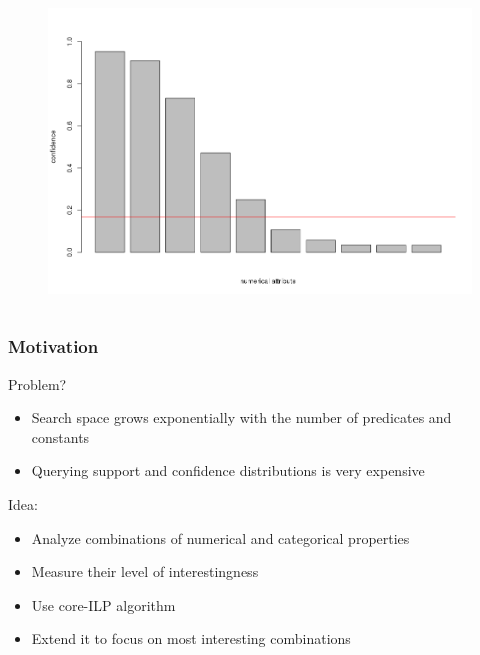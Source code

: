\documentclass{beamer}
\begin{document}
\begin{frame}
\begin{columns}[c]
    \begin{figure}
    \includegraphics[width=1\linewidth]{./Figures/confidenceDistribution}
    \end{figure}
\end{columns}

\end{frame}
\begin{frame}
\frametitle{Motivation}
 Problem?
 \begin{itemize}
    \item Search space grows exponentially with the number of predicates and constants
    \item Querying support and confidence distributions is very expensive
 \end{itemize}
 Idea:
 \begin{itemize}
    \item Analyze combinations of numerical and categorical properties
    \item Measure their level of interestingness
    \item Use core-ILP algorithm
    \item Extend it to focus on most interesting combinations
 \end{itemize}
\end{frame}
\end{document}
